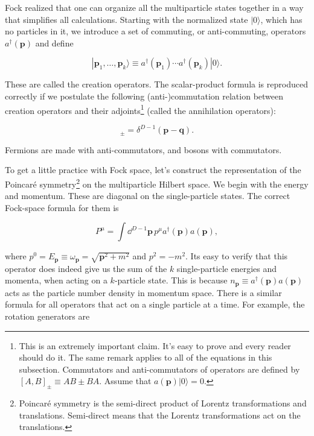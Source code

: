 Fock realized that one can organize all the multiparticle states together in a way
that simplifies all calculations. Starting with the normalized state $|0\rangle$, which has no
particles in it, we introduce a set of commuting, or anti-commuting, operators $a^\dagger(\mathbf p)$ and
define

\begin{equation}
|\mathbf p_1,\ldots,\mathbf p_k\rangle\equiv a^\dagger(\mathbf p_1)\cdots a^\dagger(\mathbf p_k)|0\rangle.
\label{eq:2.2}
\end{equation}

These are called the creation operators. The scalar-product formula is reproduced
correctly if we postulate the following (anti-)commutation relation between creation
operators and their adjoints\footnote[1]{This is an extremely important claim. It's easy to prove and every reader should do it. The same remark applies to all of the equations in this subsection. Commutators and anti-commutators of operators are defined by $[A,B]_{\pm}\equiv AB\pm BA$. Assume that $a(\mathbf p)|0\rangle=0$.} (called the annihilation operators):

\begin{equation}
[a(\mathbf p),a^\dagger(\mathbf q)]_{\pm}=\delta^{D-1}(\mathbf p-\mathbf q).
\label{eq:2.3}
\end{equation}

Fermions are made with anti-commutators, and bosons with commutators.

To get a little practice with Fock space, let's construct the representation of the
Poincaré symmetry\footnote[2]{Poincaré symmetry is the semi-direct product of Lorentz transformations and translations. Semi-direct means that the Lorentz transformations act on the translations.} on the multiparticle Hilbert space. We begin with the energy and momentum. These are diagonal on the single-particle states. The correct Fock-space
formula for them is

\begin{equation}
P^\mu=\int\dd^{D-1}\mathbf p\,p^\mu a^\dagger(\mathbf p)a(\mathbf p),
\label{eq:2.4}
\end{equation}

where $p^0=E_{\mathbf p}\equiv\omega_{\mathbf p}=\sqrt{\mathbf p^2+m^2}$ and $p^2=-m^2$. Its easy to verify that this operator does indeed give us the sum of the $k$
single-particle energies and momenta, when acting on a $k$-particle state. This is because
$n_{\mathbf p}\equiv a^\dagger(\mathbf p)a(\mathbf p)$ acts as the particle number density in momentum space. There is a
similar formula for all operators that act on a single particle at a time. For example,
the rotation generators are

